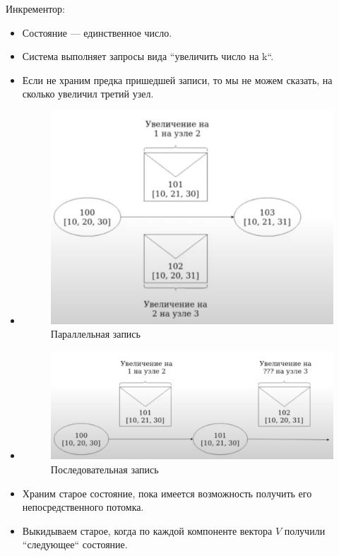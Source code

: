     \begin{example}
      Инкрементор:\\
        \begin{itemize}
          \item Состояние --- единственное число.
          \item Система выполняет запросы вида ``увеличить число на k``.
          \item Если не храним предка пришедшей записи, то мы не можем сказать, на сколько увеличил третий узел.
          \item \begin{figure}[h]
                        \centering
                        \includegraphics[scale = 0.5]{../assets/15.png}
                        \caption{Параллельная запись}
                \end{figure}
          \item \begin{figure}[h]
                        \centering
                        \includegraphics[scale = 0.5]{../assets/16.png}
                        \caption{Последовательная запись}
                \end{figure}
          \item Храним старое состояние, пока имеется возможность получить его непосредственного потомка.
          \item Выкидываем старое, когда по каждой компоненте вектора $V$ получили ``следующее`` состояние.
      \end{itemize}
    \end{example}

